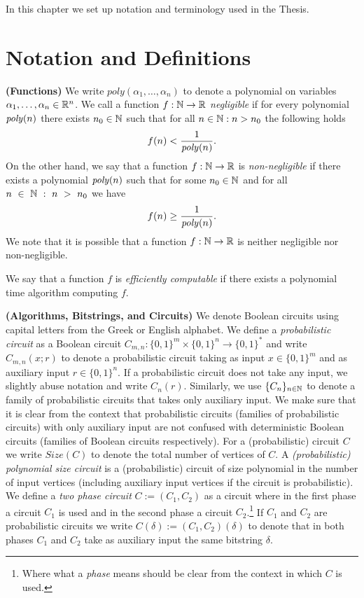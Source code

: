 In this chapter we set up notation and terminology used in the Thesis.
%
%
\section{Notation and Definitions}
\textbf{(Functions)}
We write $\mathit{poly}(\alpha_1, \dots, \alpha_n)$ to denote a polynomial on variables $\alpha_1, \dots, \alpha_n \in \mathbb{R}^n$.
We call a function $f: \mathbb{N} \rightarrow \mathbb{R}$ \textit{negligible} if for every polynomial $\operatorname{\mathit{poly}}(n)$
there exists $n_0 \in \mathbb{N}$ such that for all $n \in \mathbb{N} : n > n_0$ the following holds
\begin{align*}
f(n) < \frac{1}{\operatorname{\mathit{poly}}(n)}.
\end{align*}
On the other hand, we say that a function $f: \mathbb{N} \rightarrow \mathbb{R}$ is \textit{non-negligible} if
there exists a polynomial $\operatorname{\mathit{poly}}(n)$ such that for some $n_0 \in \mathbb{N}$ and for all $n~\in~\mathbb{N}~:~n~>~n_0$ we have
\begin{align*}
  f(n) \geq \frac{1}{\operatorname{\mathit{poly}}(n)}.
\end{align*}
We note that it is possible that a function $f:\mathbb{N} \rightarrow \mathbb{R}$ is neither negligible nor non-negligible.

We say that a function $f$ is \textit{efficiently computable} if there exists a polynomial time algorithm computing $f$.

\textbf{(Algorithms, Bitstrings, and Circuits)}
We denote Boolean circuits using capital letters from the Greek or English alphabet.
We define a \textit{probabilistic circuit} as a Boolean circuit $C_{m,n} : \{0,1\}^{m} \times \{0,1\}^{n} \rightarrow \{0,1\}^{*}$ and
write $C_{m,n}(x;r)$ to denote a probabilistic circuit taking as input  $x \in \{0,1\}^{m}$ and as auxiliary input $r \in \{0,1\}^{n}$.
If a probabilistic circuit does not take any input, we slightly abuse notation and write $C_{n}(r)$.
Similarly, we use $\{C_n\}_{n \in \mathbb{N}}$ to denote a family of probabilistic circuits that takes only auxiliary input.
We make sure that it is clear from the context that probabilistic circuits (families of probabilistic circuits) with only auxiliary input
are not confused with deterministic Boolean circuits (families of Boolean circuits respectively).
For a (probabilistic) circuit $C$ we write $\mathit{Size}(C)$ to denote the total number of vertices of $C$.
A \textit{(probabilistic) polynomial size circuit} is a (probabilistic) circuit of size polynomial in the number of input vertices
(including auxiliary input vertices if the circuit is probabilistic).
We define a \textit{two phase circuit} $C := (C_1, C_2)$ as a circuit where in the first phase a circuit $C_1$ is used and in the second phase a circuit $C_2$.\footnote{
Where what a \textit{phase} means should be clear from the context in which $C$ is used.}
If $C_1$ and $C_2$ are probabilistic circuits we write $C(\delta) := (C_1, C_2)(\delta)$ to denote that in both phases $C_1$ and $C_2$ take
as auxiliary input the same bitstring $\delta$.

